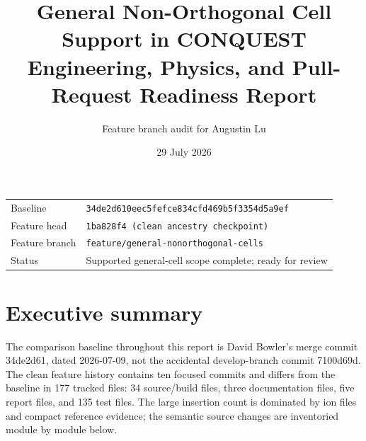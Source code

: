 \documentclass[10pt,a4paper]{report}
\title{\Huge General Non-Orthogonal Cell Support in CONQUEST\\[5mm]\Large Engineering, Physics, and Pull-Request Readiness Report}
\author{Feature branch audit for Augustin Lu}
\date{29 July 2026}
\begin{document}
\maketitle
\begin{center}
\begin{tabular}{ll}
\toprule
Baseline & \texttt{34de2d610eec5fefce834cfd469b5f3354d5a9ef}\\
Feature head & \texttt{1ba828f4 (clean ancestry checkpoint)}\\
Feature branch & \texttt{feature/general-nonorthogonal-cells}\\
Status & Supported general-cell scope complete; ready for review\\
\bottomrule
\end{tabular}
\end{center}
\clearpage
\tableofcontents
\clearpage
\chapter{Executive summary}
\begin{center}\end{center}
The comparison baseline throughout this report is David Bowler's merge commit 34de2d61, dated 2026-07-09, not the accidental develop-branch commit 7100d69d. The clean feature history contains ten focused commits and differs from the baseline in 177 tracked files: 34 source/build files, three documentation files, five report files, and 135 test files. The large insertion count is dominated by ion files and compact reference evidence; the semantic source changes are inventoried module by module below.
\end{document}
